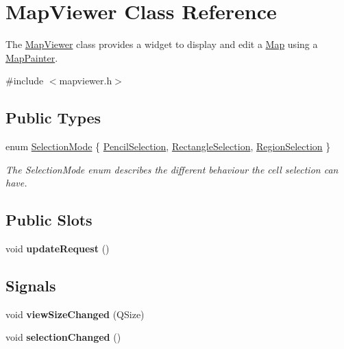 \hypertarget{class_map_viewer}{\section{\-Map\-Viewer \-Class \-Reference}
\label{class_map_viewer}
}


\-The \hyperlink{class_map_viewer}{\-Map\-Viewer} class provides a widget to display and edit a \hyperlink{class_map}{\-Map} using a \hyperlink{class_map_painter}{\-Map\-Painter}.  




{\ttfamily \#include $<$mapviewer.\-h$>$}

\subsection*{\-Public \-Types}
\begin{DoxyCompactItemize}
\item 
enum \hyperlink{class_map_viewer_a8a7a365452e5770c1fab21a9bfb0067d}{\-Selection\-Mode} \{ \hyperlink{class_map_viewer_a8a7a365452e5770c1fab21a9bfb0067dad92f9b8968a2dac53903589a13c4c898}{\-Pencil\-Selection}, 
\hyperlink{class_map_viewer_a8a7a365452e5770c1fab21a9bfb0067da551f2219d9274f32ee0d787cca9a0253}{\-Rectangle\-Selection}, 
\hyperlink{class_map_viewer_a8a7a365452e5770c1fab21a9bfb0067da73f86e7956b7b2b6013ce0e20fa5eea0}{\-Region\-Selection}
 \}
\begin{DoxyCompactList}\small\item\em \-The \-Selection\-Mode enum describes the different behaviour the cell selection can have. \end{DoxyCompactList}\end{DoxyCompactItemize}
\subsection*{\-Public \-Slots}
\begin{DoxyCompactItemize}
\item 
\hypertarget{class_map_viewer_af6db4693f536ea5ce8b7b6f05d4099ea}{void {\bfseries update\-Request} ()}\label{class_map_viewer_af6db4693f536ea5ce8b7b6f05d4099ea}

\end{DoxyCompactItemize}
\subsection*{\-Signals}
\begin{DoxyCompactItemize}
\item 
\hypertarget{class_map_viewer_afe0db95f8db428737b5225663dd2b127}{void {\bfseries view\-Size\-Changed} (\-Q\-Size)}\label{class_map_viewer_afe0db95f8db428737b5225663dd2b127}

\item 
\hypertarget{class_map_viewer_a60b95fc5e6817673a532b11a139a0eab}{void {\bfseries selection\-Changed} ()}\label{class_map_viewer_a60b95fc5e6817673a532b11a139a0eab}

\end{DoxyCompactItemize}
